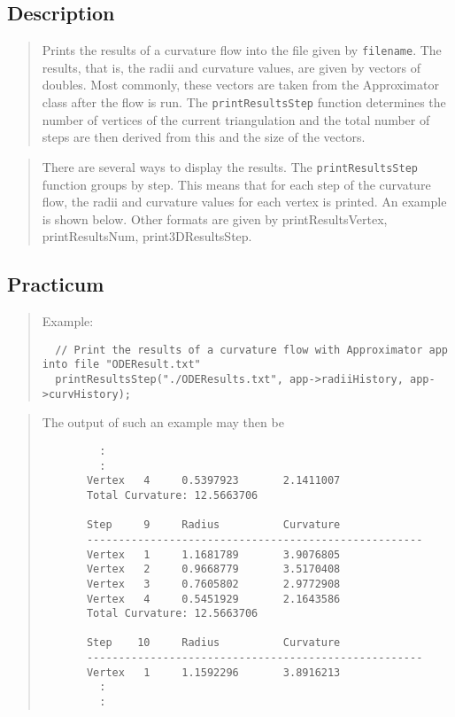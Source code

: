 \documentclass[10pt]{article}%
\begin{document}
\subsection*{Description}

\begin{quotation} Prints the results of a curvature flow into the file given by \texttt{filename}. The results, that is, the radii and curvature values, are given by vectors of doubles. Most commonly, these vectors are taken from the Approximator class after the flow is run. The \texttt{printResultsStep} function determines the number of vertices of the current triangulation and the total number of steps are then derived from this and the size of the vectors.\end{quotation}
\begin{quotation} There are several ways to display the results. The \texttt{printResultsStep} function groups by step. This means that for each step of the curvature flow, the radii and curvature values for each vertex is printed. An example is shown below. Other formats are given by printResultsVertex, printResultsNum, print3DResultsStep.\end{quotation}

\subsection*{Practicum}

\begin{quotation} Example:{\small{\begin{verbatim} 
  // Print the results of a curvature flow with Approximator app into file "ODEResult.txt"
  printResultsStep("./ODEResults.txt", app->radiiHistory, app->curvHistory);
  \end{verbatim}
}}
\end{quotation}\begin{quotation} The output of such an example may then be{\small{\begin{verbatim}       
         :    
         :
       Vertex   4     0.5397923       2.1411007
       Total Curvature: 12.5663706

       Step     9     Radius          Curvature
       -----------------------------------------------------
       Vertex   1     1.1681789       3.9076805
       Vertex   2     0.9668779       3.5170408
       Vertex   3     0.7605802       2.9772908
       Vertex   4     0.5451929       2.1643586
       Total Curvature: 12.5663706

       Step    10     Radius          Curvature
       -----------------------------------------------------
       Vertex   1     1.1592296       3.8916213
         :
         :
  \end{verbatim}
}}
\end{quotation}
\end{document}
